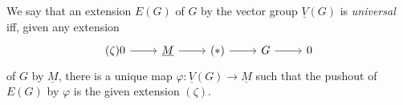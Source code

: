 \documentclass[../Main]{subfiles}
\begin{document}
\begin{defn}
	We say that an extension $E(G)$ of $G$ by the vector group $\underline{V}(G)$ is
	{\em universal} iff, given any extension
	\begin{equation*}
	\begin{tikzcd}
		(\zeta)
		0 \arrow[r, "", rightarrow] &
		\underline{M} \arrow[r, "", rightarrow] &
		(*) \arrow[r, "", rightarrow] &
		G \arrow[r, "", rightarrow] &
		0
	\end{tikzcd}
	\end{equation*}
	of $G$ by $\underline{M}$, there is a unique map $\varphi\colon \underline{V}(G) \to \underline{M}$
	such that the pushout of $E(G)$ by $\varphi$ is the given
	extension $(\zeta)$.
\end{defn}
\end{document}
